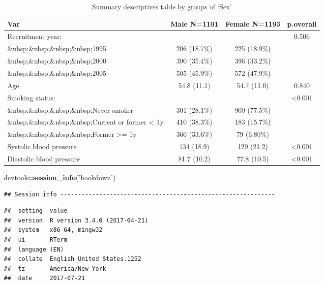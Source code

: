 \documentclass[]{article}
\newenvironment{Shaded}{\begin{snugshade}}{\end{snugshade}}
\newcommand{\KeywordTok}[1]{\textcolor[rgb]{0.13,0.29,0.53}{\textbf{#1}}}
\newcommand{\StringTok}[1]{\textcolor[rgb]{0.31,0.60,0.02}{#1}}
\newcommand{\OperatorTok}[1]{\textcolor[rgb]{0.81,0.36,0.00}{\textbf{#1}}}
\newcommand{\NormalTok}[1]{#1}
\begin{document}
\begin{table}

\caption{\label{tab:md-output}Summary descriptives table by groups of `Sex'}
\centering
\begin{tabular}[t]{l|c|c|c}
\hline
Var & Male   N=1101 & Female   N=1193 & p.overall\\
\hline
Recruitment year: &  &  & 0.506\\
\hline
\&nbsp;\&nbsp;\&nbsp;\&nbsp;1995 & 206 (18.7\%) & 225 (18.9\%) & \\
\hline
\&nbsp;\&nbsp;\&nbsp;\&nbsp;2000 & 390 (35.4\%) & 396 (33.2\%) & \\
\hline
\&nbsp;\&nbsp;\&nbsp;\&nbsp;2005 & 505 (45.9\%) & 572 (47.9\%) & \\
\hline
Age & 54.8 (11.1) & 54.7 (11.0) & 0.840\\
\hline
Smoking status: &  &  & <0.001\\
\hline
\&nbsp;\&nbsp;\&nbsp;\&nbsp;Never smoker & 301 (28.1\%) & 900 (77.5\%) & \\
\hline
\&nbsp;\&nbsp;\&nbsp;\&nbsp;Current or former < 1y & 410 (38.3\%) & 183 (15.7\%) & \\
\hline
\&nbsp;\&nbsp;\&nbsp;\&nbsp;Former >= 1y & 360 (33.6\%) & 79 (6.80\%) & \\
\hline
Systolic blood pressure & 134 (18.9) & 129 (21.2) & <0.001\\
\hline
Diastolic blood pressure & 81.7 (10.2) & 77.8 (10.5) & <0.001\\
\hline
\end{tabular}
\end{table}

\begin{Shaded}
\begin{Highlighting}[]
\NormalTok{devtools}\OperatorTok{::}\KeywordTok{session_info}\NormalTok{(}\StringTok{'bookdown'}\NormalTok{)}
\end{Highlighting}
\end{Shaded}

\begin{verbatim}
## Session info -------------------------------------------------------------
\end{verbatim}

\begin{verbatim}
##  setting  value                       
##  version  R version 3.4.0 (2017-04-21)
##  system   x86_64, mingw32             
##  ui       RTerm                       
##  language (EN)                        
##  collate  English_United States.1252  
##  tz       America/New_York            
##  date     2017-07-21
\end{verbatim}
\end{document}
